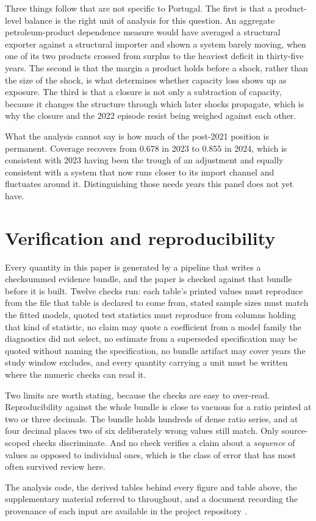 \documentclass[11pt,a4paper]{article}
\begin{document}
Three things follow that are not specific to Portugal. The first is that a product-level
balance is the right unit of analysis for this question. An aggregate petroleum-product
dependence measure would have averaged a structural exporter against a structural importer and
shown a system barely moving, when one of its two products crossed from surplus to the heaviest
deficit in thirty-five years. The second is that the margin a product holds before a shock,
rather than the size of the shock, is what determines whether capacity loss shows up as
exposure. The third is that a closure is not only a subtraction of capacity, because it changes
the structure through which later shocks propagate, which is why the closure and the 2022 episode
resist being weighed against each other.

What the analysis cannot say is how much of the post-2021 position is permanent. Coverage
recovers from $0.678$ in 2023 to $0.855$ in 2024, which is consistent with 2023 having been the
trough of an adjustment and equally consistent with a system that now runs closer to its import
channel and fluctuates around it. Distinguishing those needs years this panel does not yet
have.

\section*{Verification and reproducibility}
\label{sec:verification}

Every quantity in this paper is generated by a pipeline that writes a checksummed evidence
bundle, and the paper is checked against that bundle before it is built. Twelve checks run: each
table's printed values must reproduce from the file that table is declared to come from, stated
sample sizes must match the fitted models, quoted test statistics must reproduce from columns
holding that kind of statistic, no claim may quote a coefficient from a model family the
diagnostics did not select, no estimate from a superseded specification may be quoted without
naming the specification, no bundle artifact may cover years the study window excludes, and
every quantity carrying a unit must be written where the numeric checks can read it.

Two limits are worth stating, because the checks are easy to over-read. Reproducibility against
the whole bundle is close to vacuous for a ratio printed at two or three decimals. The
bundle holds hundreds of dense ratio series, and at four decimal places two of six deliberately wrong
values still match. Only source-scoped checks discriminate. And no check verifies a claim about a
\emph{sequence} of values as opposed to individual ones, which is the class of error that has
most often survived review here.

The analysis code, the derived tables behind every figure and table above, the supplementary
material referred to throughout, and a document recording the provenance of each input are
available in the project repository \citep{repository}.


\end{document}
